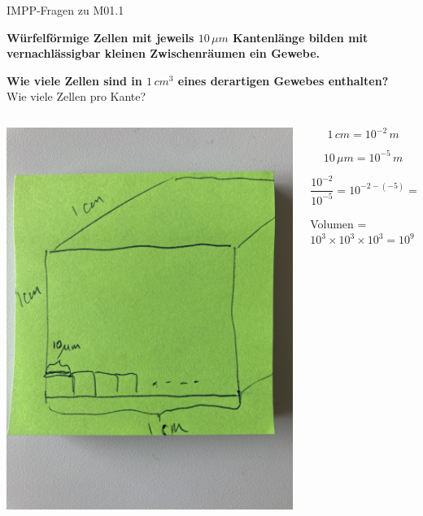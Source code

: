 \documentclass{beamer}
\begin{document}
\begin{frame}{IMPP-Fragen zu M01.1}

\textbf{Würfelförmige Zellen mit jeweils \(10\,\mu m\) Kantenlänge  bilden mit vernachlässigbar kleinen Zwischenräumen ein Gewebe.}

\textbf{Wie viele Zellen sind in \(1\,cm^3 \) eines derartigen Gewebes enthalten?} \\[0.2 cm]


Wie viele Zellen pro Kante? 



\begin{columns}[c]

\begin{column}{5cm}
\includegraphics[width=\textwidth]{Zellen.jpeg}
\end{column}

\begin{column}{6cm}
\[1\,cm = 10^{-2}\,m\]

\[10\,\mu m = 10^{-5}\,m\]

\[
\frac {10^{-2}}{10^{-5}} = 10^{-2-(-5)} = 10^3
 \]

Volumen = \(10^3 \times 10^3 \times 10^3 = 10^9 = 1\, \text{Milliarde} \)

\end{column}

\end{columns}

\end{frame}
\end{document}
